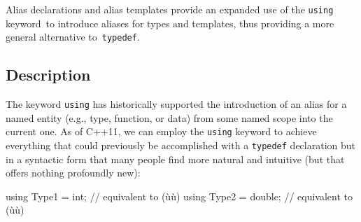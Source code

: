 
\setcounter{table}{0}
\setcounter{footnote}{0}
\setcounter{lstlisting}{0}




Alias declarations and alias templates provide an expanded use of the \lstinline!using! keyword~to introduce aliases for types and templates, thus providing a more general alternative to~\lstinline!typedef!.

\subsection[Description]{Description}\label{description}

The keyword \lstinline!using! has historically supported the introduction
of an alias for a named entity (e.g., type, function, or data) from some
named scope into the current one.
As of C++11, we can
employ the \lstinline!using! keyword to achieve everything that could
previously be accomplished with a \lstinline!typedef! declaration but in a
syntactic form that many people find more natural and intuitive (but
that offers nothing profoundly new):

\begin{emcppslisting}
using Type1 = int;     // equivalent to (ù{}ù)
using Type2 = double;  // equivalent to (ù{}ù)
\end{emcppslisting}


